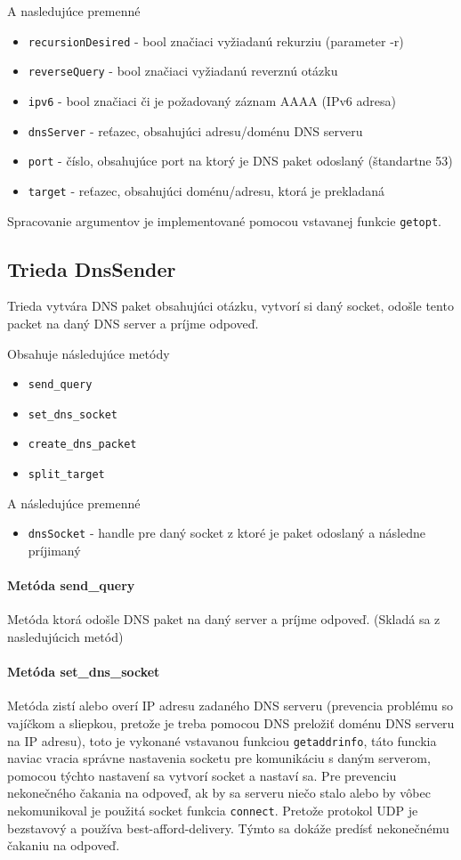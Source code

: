 \documentclass[titlepage]{article}
\begin{document}
A nasledujúce premenné
\begin{itemize}
    \item \verb|recursionDesired| - bool značiaci vyžiadanú rekurziu (parameter -r)
    \item \verb|reverseQuery| - bool značiaci vyžiadanú reverznú otázku
    \item \verb|ipv6| - bool značiaci či je požadovaný záznam AAAA (IPv6 adresa)
    \item \verb|dnsServer| - reťazec, obsahujúci adresu/doménu DNS serveru
    \item \verb|port| - číslo, obsahujúce port na ktorý je DNS paket odoslaný (štandartne 53)
    \item \verb|target| - reťazec, obsahujúci doménu/adresu, ktorá je prekladaná
\end{itemize}
Spracovanie argumentov je implementované pomocou vstavanej funkcie \verb|getopt|.

\subsection{Trieda DnsSender}
Trieda vytvára DNS paket obsahujúci otázku, vytvorí si daný socket, odošle tento packet 
na daný DNS server a príjme odpoveď.

Obsahuje následujúce metódy
\begin{itemize}
   \item \verb|send_query|
   \item \verb|set_dns_socket|
   \item \verb|create_dns_packet|
   \item \verb|split_target|
\end{itemize}

A následujúce premenné
\begin{itemize}
   \item \verb|dnsSocket| - handle pre daný socket z ktoré je paket odoslaný a následne príjimaný 
\end{itemize}

\paragraph{Metóda send\_query}
Metóda ktorá odošle DNS paket na daný server a príjme odpoveď. (Skladá sa z nasledujúcich metód)

\paragraph{Metóda set\_dns\_socket}
Metóda zistí alebo overí IP adresu zadaného DNS serveru (prevencia problému so vajíčkom a sliepkou,
pretože je treba pomocou DNS preložiť doménu DNS serveru na IP adresu), toto je vykonané vstavanou funkciou
\verb|getaddrinfo|, táto funckia naviac vracia správne nastavenia socketu pre komunikáciu s daným 
serverom, pomocou týchto nastavení sa vytvorí socket a nastaví sa. Pre prevenciu nekonečného čakania na odpoveď,
ak by sa serveru niečo stalo alebo by vôbec nekomunikoval je použitá socket funkcia \verb|connect|. Pretože 
protokol UDP je bezstavový a používa best-afford-delivery. Týmto sa dokáže predísť nekonečnému čakaniu na odpoveď.
\end{document}
